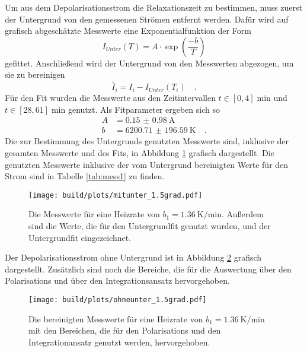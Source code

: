 \noindent
Um aus dem Depolarisationsstrom die Relaxationszeit zu bestimmen, muss zuerst der Untergrund von den gemessenen Strömen entfernt werden.
Dafür wird auf grafisch abgeschätzte Messwerte eine Exponentialfunktion der Form
\begin{equation}
  I_{Unter}(T) = A\cdot \exp\left(\frac{-b}{T}\right)
  \label{eqn:exp}
\end{equation}
gefittet. Anschließend wird der Untergrund von den Messwerten abgezogen, um sie zu bereinigen
\begin{equation*}
  \tilde{I_i} = I_i - I_{Unter}(T_i) \quad.
\end{equation*}
Für den Fit wurden die Messwerte aus den Zeitintervallen $t \in [0,4] \; \si{\minute}$ und $t \in [28,61] \; \si{\minute}$ genutzt.
Als Fitparameter ergeben sich so 
\begin{align*}
  A &= \SI{0.15(098)}{\ampere}\\
  b &= \SI{6200.71(19659)}{\kelvin} \quad .
\end{align*}
Die zur Bestimmung des Untergrunds genutzten Messwerte sind,
inklusive der gesamten Messwerte und des Fits, in Abbildung \ref{img:mitunter15} grafisch dargestellt. 
Die genutzten Messwerte inklusive der vom Untergrund bereinigten Werte für den Strom sind in Tabelle \ref{tab:mess1} zu finden.
\begin{figure}[h]
  \centering
  \texttt{[image: build/plots/mitunter\_1.5grad.pdf]}
  \caption{Die Messwerte für eine Heizrate von $b_1 = \SI{1.36}{\kelvin\per\minute}$. 
  Außerdem sind die Werte, die für den Untergrundfit genutzt wurden, und der Untergrundfit eingezeichnet.}
  \label{img:mitunter15}
\end{figure}

\noindent
Der Depolarisationsstrom ohne Untergrund ist in Abbildung \ref{img:ohneunter15} grafisch dargestellt. 
Zusätzlich sind noch die Bereiche, die für die Auswertung über den Polarisations und über den Integrationsansatz hervorgehoben.
\begin{figure}[H]
  \centering
  \texttt{[image: build/plots/ohneunter\_1.5grad.pdf]}
  \caption{Die bereinigten Messwerte für eine Heizrate von $b_1 = \SI{1.36}{\kelvin\per\minute}$ 
          mit den Bereichen, die für den Polarisations und den Integrationansatz genutzt werden, hervorgehoben.}
  \label{img:ohneunter15}
\end{figure}

